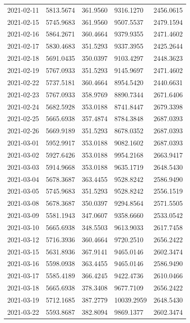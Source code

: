 \begin{footnotesize}
\begin{longtable}{lllll}
2021-02-11 & 5813.5674 & 361.9560 & 9316.1270 & 2456.0615 \\
2021-02-15 & 5745.9683 & 361.9560 & 9507.5537 & 2479.1594 \\
2021-02-16 & 5864.2671 & 360.4664 & 9379.9355 & 2471.4602 \\
2021-02-17 & 5830.4683 & 351.5293 & 9337.3955 & 2425.2644 \\
2021-02-18 & 5691.0435 & 350.0397 & 9103.4297 & 2448.3623 \\
2021-02-19 & 5767.0933 & 351.5293 & 9145.9697 & 2471.4602 \\
2021-02-22 & 5737.5181 & 360.4664 & 8954.5420 & 2440.6631 \\
2021-02-23 & 5767.0933 & 358.9769 & 8890.7344 & 2671.6406 \\
2021-02-24 & 5682.5928 & 353.0188 & 8741.8447 & 2679.3398 \\
2021-02-25 & 5665.6938 & 357.4874 & 8784.3848 & 2687.0393 \\
2021-02-26 & 5669.9189 & 351.5293 & 8678.0352 & 2687.0393 \\
2021-03-01 & 5952.9917 & 353.0188 & 9082.1602 & 2687.0393 \\
2021-03-02 & 5927.6426 & 353.0188 & 9954.2168 & 2663.9417 \\
2021-03-03 & 5914.9668 & 353.0188 & 9635.1719 & 2648.5430 \\
2021-03-04 & 5678.3687 & 363.4455 & 9528.8242 & 2586.9490 \\
2021-03-05 & 5745.9683 & 351.5293 & 9528.8242 & 2556.1519 \\
2021-03-08 & 5678.3687 & 350.0397 & 9294.8564 & 2571.5505 \\
2021-03-09 & 5581.1943 & 347.0607 & 9358.6660 & 2533.0542 \\
2021-03-10 & 5665.6938 & 348.5503 & 9613.9033 & 2617.7458 \\
2021-03-12 & 5716.3936 & 360.4664 & 9720.2510 & 2656.2422 \\
2021-03-15 & 5631.8936 & 367.9141 & 9465.0146 & 2602.3474 \\
2021-03-16 & 5598.0938 & 363.4455 & 9465.0146 & 2586.9490 \\
2021-03-17 & 5585.4189 & 366.4245 & 9422.4736 & 2610.0466 \\
2021-03-18 & 5665.6938 & 378.3408 & 9677.7109 & 2656.2422 \\
2021-03-19 & 5712.1685 & 387.2779 & 10039.2959 & 2648.5430 \\
2021-03-22 & 5593.8687 & 382.8094 & 9869.1377 & 2602.3474 \\

\end{longtable}
\end{footnotesize}

